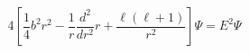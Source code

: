 \begin{equation}                                
4[\frac{1}{4}b^{2}r^{2}-\frac{1}{r}\frac{d^{2}}{dr^{2}}r                                
+\frac{\ell(\ell+1)}{r^{2}}]\Psi=E^{2}\Psi                                
\end{equation} 
